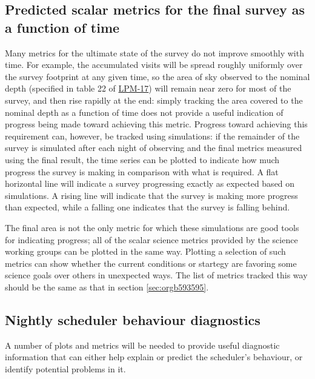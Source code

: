 \subsection{Predicted scalar metrics for the final survey as a function of time}
\label{sec:orgbf22792}
Many metrics for the ultimate state of the survey do not improve smoothly with time.
For example, the accumulated visits will be spread roughly uniformly over the survey footprint at any given time, so the area of sky observed to the nominal depth (specified in table 22 of \href{http://ls.st/lpm-17}{LPM-17}) will remain near zero for most of the survey, and then rise rapidly at the end: simply tracking the area covered to the nominal depth as a function of time does not provide a useful indication of progress being made toward achieving this metric.
Progress toward achieving this requirement can, however, be tracked using simulations: if the remainder of the survey is simulated after each night of observing and the final metrics measured using the final result, the time series can be plotted to indicate how much progress the survey is making in comparison with what is required.
A flat horizontal line will indicate a survey progressing exactly as expected based on simulations.
A rising line will indicate that the survey is making more progress than expected, while a falling one indicates that the survey is falling behind.

The final area is not the only metric for which these simulations are good tools for indicating progress; all of the scalar science metrics provided by the science working groups can be plotted in the same way. Plotting a selection of such metrics can show whether the current conditions or startegy are favoring some science goals over others in unexpected ways.
The list of metrics tracked this way should be the same as that in section \ref{sec:orgb593595}.

\subsection{Nightly scheduler behaviour diagnostics}
\label{sec:orgf8b40d9}
A number of plots and metrics will be needed to provide useful diagnostic information that can either help explain or predict the scheduler's behaviour, or identify potential problems in it.

